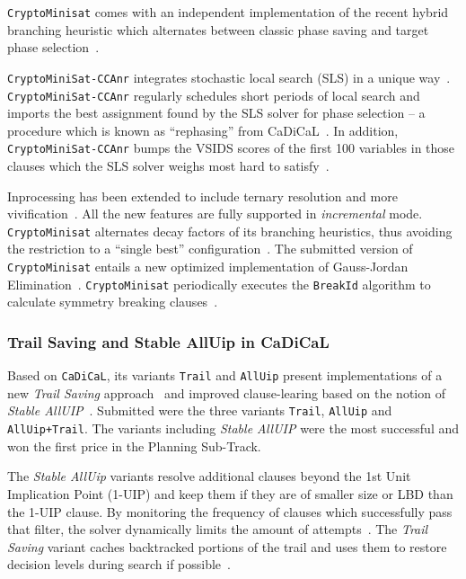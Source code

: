 \documentclass{elsarticle}
\newcommand{\solver}[1]{\texttt{#1}}
\begin{document}
\solver{CryptoMinisat} comes with an independent implementation of the recent hybrid branching heuristic which alternates between classic phase saving and target phase selection~\cite{Biere:SC2019}.

\solver{CryptoMiniSat-CCAnr} integrates stochastic local search (SLS) in a unique way~\cite{Cai:2015:CCAnr}. 
\solver{CryptoMiniSat-CCAnr} regularly schedules short periods of local search and imports the best assignment found by the SLS solver for phase selection -- a procedure which is known as ``rephasing'' from CaDiCaL~\cite{Biere:SC2019}.
In addition, \solver{CryptoMiniSat-CCAnr} bumps the VSIDS scores of the first 100 variables in those clauses which the SLS solver weighs most hard to satisfy~\cite{Soos:SC2020}.

Inprocessing has been extended to include ternary resolution and more vivification~\cite{ChuMinLi:2020:Vivification}. 
All the new features are fully supported in \emph{incremental} mode. 
\solver{CryptoMinisat} alternates decay factors of its branching heuristics, thus avoiding the restriction to a ``single best'' configuration~\cite{Soos:SC2020}. 
The submitted version of \solver{CryptoMinisat} entails a new optimized implementation of Gauss-Jordan Elimination~\cite{Soos:2020:CNFXOR}. 
\solver{CryptoMinisat} periodically executes the \solver{BreakId} algorithm to  calculate symmetry breaking clauses~\cite{Devriendt:2016:BreakId}.


\subsubsection{Trail Saving and Stable AllUip in CaDiCaL}

Based on \solver{CaDiCaL}, its variants \solver{Trail} and \solver{AllUip} present implementations of a new \emph{Trail Saving} approach~\cite{Hickey:2020:TrailSaving} and improved clause-learing based on the notion of \emph{Stable AllUIP}~\cite{Bacchus:SC2020}. 
Submitted were the three variants \solver{Trail}, \solver{AllUip} and \solver{AllUip+Trail}. 
The variants including \emph{Stable AllUIP} were the most successful and won the first price in the Planning Sub-Track. 

The \emph{Stable AllUip} variants resolve additional clauses beyond the 1st Unit Implication Point (1-UIP) and keep them if they are of smaller size or LBD than the 1-UIP clause. 
By monitoring the frequency of clauses which successfully pass that filter, the solver dynamically limits the amount of attempts~\cite{Zhang:2001:ClauseLearning,Bacchus:SC2020}.
The \emph{Trail Saving} variant caches backtracked portions of the trail and uses them to restore decision levels during search if possible~\cite{Hickey:2020:TrailSaving}. 
\end{document}
